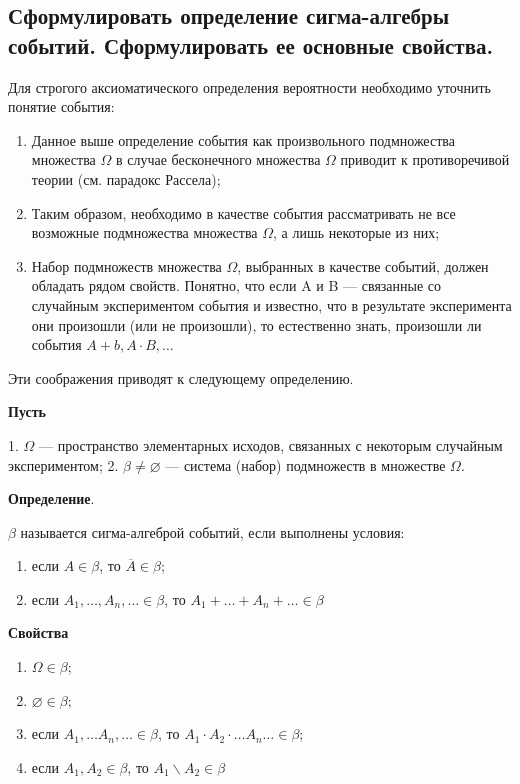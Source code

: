\subsection{Сформулировать определение сигма-алгебры событий. Сформулировать ее основные свойства.}

Для строгого аксиоматического определения вероятности необходимо уточнить понятие события:

\begin{enumerate}
	\item Данное выше определение события как произвольного подмножества множества $\Omega$ в случае бесконечного множества $\Omega$ приводит к противоречивой теории (см. парадокс Рассела);
	\item Таким образом, необходимо в качестве события рассматривать не все возможные подмножества множества $\Omega$, а лишь некоторые из них; 
	\item Набор подмножеств множества $\Omega$, выбранных в качестве событий, должен обладать рядом свойств. Понятно, что если A и B --- связанные со случайным экспериментом события и известно, что в результате эксперимента они произошли (или не произошли), то естественно знать, произошли ли события $A + b, A \cdot B, \dots$
\end{enumerate}

Эти соображения приводят к следующему определению.

\textbf{Пусть} 

1. $\Omega$ --- пространство элементарных исходов, связанных с некоторым случайным экспериментом; 
2. $\beta \neq \varnothing$ --- система (набор) подмножеств в множестве $\Omega$.

\textbf{Определение}. 

$\beta$ называется сигма-алгеброй событий, если выполнены условия: 
\begin{enumerate}
	\item если $A \in \beta$, то $\overline{A} \in \beta$;
	\item если $A_1, \dots, A_n, \dots \in \beta$, то $A_1 + \dots + A_n + \dots \in \beta$
\end{enumerate}

\textbf{Свойства}

\begin{enumerate}
	
	\item $\Omega \in \beta$;
	\item $\varnothing \in \beta$;
	\item если $A_1, \dots A_n, \dots \in \beta$, то $A_1 \cdot A_2 \cdot \dots A_n \dots \in \beta$;
	\item если $A_1, A_2 \in \beta$, то $A_1 \backslash A_2 \in \beta$
\end{enumerate}


